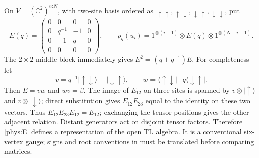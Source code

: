 \documentclass[a4paper,11pt,oneside,reqno]{amsart}
\theoremstyle{definition}
\numberwithin{equation}{section}
\begin{document}
On $V=(\mathbb C^2)^{\otimes N}$, with two-site basis ordered as
$\uparrow\uparrow,\uparrow\downarrow,\downarrow\uparrow,
\downarrow\downarrow$, put
\begin{equation}\label{phys:E}
 E(q)=\begin{pmatrix}
 0&0&0&0\\0&q^{-1}&-1&0\\0&-1&q&0\\0&0&0&0
 \end{pmatrix},\qquad
 \rho_q(u_i)=1^{\otimes(i-1)}\otimes E(q)\otimes
 1^{\otimes(N-i-1)}.
\end{equation}
The $2\times2$ middle block immediately gives $E^2=(q+q^{-1})E$.
For completeness let
\[
 v=q^{-1}|\uparrow\downarrow\rangle-|\downarrow\uparrow\rangle,
 \qquad w=\langle\uparrow\downarrow|-q\langle\downarrow\uparrow|.
\]
Then $E=vw$ and $wv=\beta$. The image of $E_{12}$ on three sites is
spanned by $v\otimes|\uparrow\rangle$ and $v\otimes|\downarrow\rangle$;
direct substitution gives $E_{12}E_{23}$ equal to the identity on these
two vectors. Thus $E_{12}E_{23}E_{12}=E_{12}$; exchanging the tensor
positions gives the other adjacent relation. Distant generators act on
disjoint tensor factors. Therefore \eqref{phys:E} defines a representation
of the open TL algebra. It is a conventional six-vertex gauge; signs and
root conventions in \cite{BJJZ} must be translated before comparing matrices.
\end{document}
